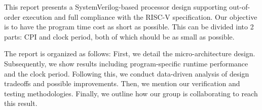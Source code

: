 
This report presents a SystemVerilog-based processor design supporting out-of-order execution and full compliance with the RISC-V specification. Our objective is to have the program time cost as short as possible. This can be divided into 2 parts: CPI and clock period, both of which should be as small as possible. 

The report is organized as follows: First, we detail the micro-architecture design. Subsequently, we show results including program-specific runtime performance and the clock period. Following this, we conduct data-driven analysis of design tradeoffs and possible improvements. Then, we mention our verification and testing methodologies. Finally, we outline how our group is collaborating to reach this result.